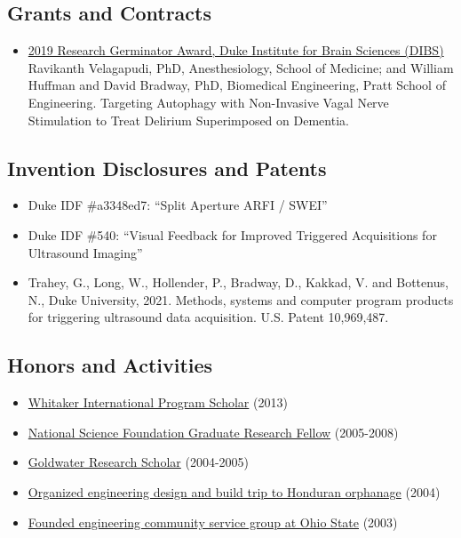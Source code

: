 \documentclass[
]{article}
\providecommand{\tightlist}{%
  \setlength{\itemsep}{0pt}\setlength{\parskip}{0pt}}
\begin{document}
\hypertarget{grants-and-contracts}{%
\subsection{Grants and Contracts}\label{grants-and-contracts}}

\begin{itemize}
\tightlist
\item
  \href{https://dibs.duke.edu/research/awards/schedule-application}{2019
  Research Germinator Award, Duke Institute for Brain Sciences (DIBS)}
  Ravikanth Velagapudi, PhD, Anesthesiology, School of Medicine; and
  William Huffman and David Bradway, PhD, Biomedical Engineering, Pratt
  School of Engineering. Targeting Autophagy with Non-Invasive Vagal
  Nerve Stimulation to Treat Delirium Superimposed on Dementia.
\end{itemize}

\hypertarget{invention-disclosures-and-patents}{%
\subsection{Invention Disclosures and
Patents}\label{invention-disclosures-and-patents}}

\begin{itemize}
\tightlist
\item
  Duke IDF \#a3348ed7: ``Split Aperture ARFI / SWEI''
\item
  Duke IDF \#540: ``Visual Feedback for Improved Triggered Acquisitions
  for Ultrasound Imaging''
\item
  Trahey, G., Long, W., Hollender, P., Bradway, D., Kakkad, V. and
  Bottenus, N., Duke University, 2021. Methods, systems and computer
  program products for triggering ultrasound data acquisition. U.S.
  Patent 10,969,487.
\end{itemize}

\hypertarget{honors-and-activities}{%
\subsection{Honors and Activities}\label{honors-and-activities}}

\begin{itemize}
\tightlist
\item
  \href{http://www.whitaker.org/grants/fellows-scholars}{Whitaker
  International Program Scholar} (2013)
\item
  \href{http://www.nsfgrfp.org/}{National Science Foundation Graduate
  Research Fellow} (2005-2008)
\item
  \href{https://goldwater.scholarsapply.org/}{Goldwater Research
  Scholar} (2004-2005)
\item
  \href{http://www.montanadeluz.org/}{Organized engineering design and
  build trip to Honduran orphanage} (2004)
\item
  \href{http://ecos.osu.edu/}{Founded engineering community service
  group at Ohio State} (2003)
\end{itemize}
\end{document}
